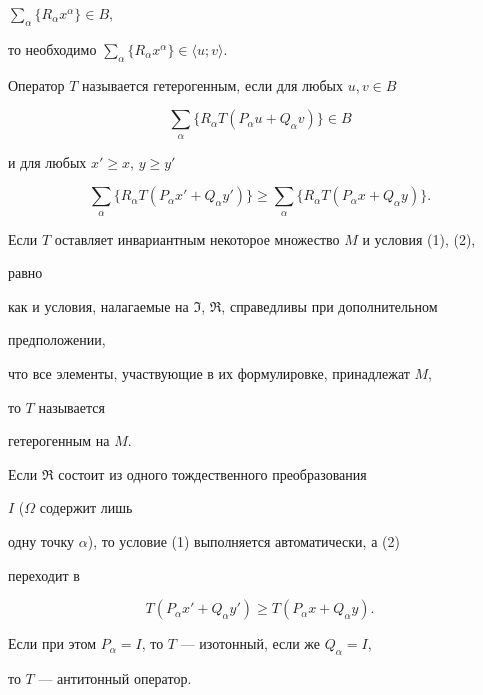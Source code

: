 $\sum\limits_\alpha\{R_\alpha x^\alpha\}\in B$,


то необходимо $\sum\limits_\alpha\{R_\alpha x^\alpha\}\in


\langle u;v\rangle$.





Оператор $T$ называется гетерогенным, если для любых $u,v\in B$


\begin{equation}


\sum_\alpha\{R_\alpha T(P_\alpha u+Q_\alpha v)\}\in B


\end{equation}


и для любых $x'\ge x$, $y\ge y'$


\begin{equation}


\sum_\alpha\{R_\alpha T(P_\alpha x'+Q_\alpha y')\}\ge


\sum_\alpha\{R_\alpha T(P_\alpha x+Q_\alpha y)\}.


\end{equation}


Если $T$ оставляет инвариантным некоторое множество $M$ и условия (1), (2),


равно


как и условия, налагаемые на $\Im$, $\Re$, справедливы при дополнительном


предположении,


что все элементы, участвующие в их формулировке, принадлежат $M$,


то $T$ называется


гетерогенным на $M$.





Если $\Re$ состоит из одного тождественного преобразования


$I$ ($\Omega$ содержит лишь


одну точку $\alpha$), то условие (1) выполняется автоматически, а (2)


переходит в


\begin{equation}


T(P_\alpha x'+Q_\alpha y')\ge T(P_\alpha x+Q_\alpha y).


\end{equation}


Если при этом $P_\alpha=I$, то $T$ --- изотонный, если же $Q_\alpha=I$,


то $T$ --- антитонный оператор.





